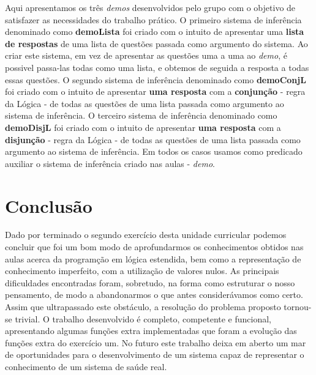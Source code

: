 \documentclass{report}
\begin{document}
Aqui apresentamos os três \textit{demos} desenvolvidos pelo grupo com o objetivo de satisfazer as necessidades do trabalho prático. O primeiro sistema de inferência denominado como \textbf{demoLista} foi criado com o intuito de apresentar uma \textbf{lista de respostas} de uma lista de questões passada como argumento do sistema. Ao criar este sistema, em vez de apresentar as questões uma a uma ao \textit{demo}, é possivel passa-las todas como uma lista, e obtemos de seguida a resposta a todas essas questões.
O segundo sistema de inferência denominado como \textbf{demoConjL} foi criado com o intuito de apresentar \textbf{uma resposta} com a \textbf{conjunção} - regra da Lógica - de todas as questões de uma lista passada como argumento ao sistema de inferência.
O terceiro sistema de inferência denominado como \textbf{demoDisjL} foi criado com o intuito de apresentar \textbf{uma resposta} com a \textbf{disjunção} - regra da Lógica - de todas as questões de uma lista passada como argumento ao sistema de inferência.
Em todos os casos usamos como predicado auxiliar o sistema de inferência criado nas aulas - \textit{demo}.
































\chapter{Conclusão} \label{concl}

Dado por terminado o segundo exercício desta unidade curricular podemos concluir que foi um bom modo de aprofundarmos os conhecimentos obtidos nas aulas acerca da programção em lógica estendida, bem como a representação de conhecimento imperfeito, com a utilização de valores nulos.
As principais dificuldades encontradas foram, sobretudo, na forma como estruturar o nosso pensamento, de modo a abandonarmos o que antes considerávamos como certo. Assim que ultrapassado este obstáculo, a resolução do problema proposto tornou-se trivial.
O trabalho desenvolvido é completo, competente e funcional, apresentando algumas funções extra implementadas que foram a evolução das funções extra do exercício um.
No futuro este trabalho deixa em aberto um mar de oportunidades para o desenvolvimento de um sistema capaz de representar o conhecimento de um sistema de saúde real.
 


 
 
 
\end{document}
